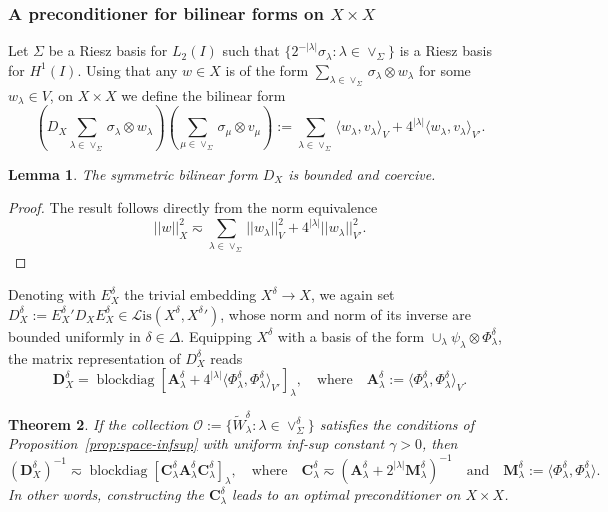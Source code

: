 \documentclass[11pt,a4paper,oneside,english]{amsart}
\numberwithin{equation}{section}
\newtheorem{theorem}{Theorem}
\numberwithin{theorem}{section}
\newtheorem{lemma}[theorem]{Lemma}
\theoremstyle{definition}
\DeclareMathOperator{\blockdiag}{blockdiag}
\newcommand{\la}{\langle}
\newcommand{\ra}{\rangle}
\newcommand{\cL}{\mathcal L}
\newcommand{\Lis}{\cL\mathrm{is}}
\newcommand{\jw}[1]{{\color{red}{JW: #1}}}
\begin{document}
\subsubsection{A preconditioner for bilinear forms on $X \times X$}
Let $\Sigma$ be a Riesz basis for $L_2(I)$ such that
$\{2^{-|\lambda|}\sigma_\lambda : \lambda \in \vee_\Sigma\}$ is a Riesz basis for $H^1(I)$.
Using that any $w \in X$ is of the form $\sum_{\lambda \in \vee_\Sigma} \sigma_\lambda \otimes w_\lambda$ for some $w_\lambda \in V$,
on $X \times X$ we define the bilinear form
\[
  (D_X \sum_{\lambda \in \vee_{\Sigma}} \sigma_\lambda \otimes w_\lambda)(\sum_{\mu \in \vee_{\Sigma}} \sigma_\mu \otimes v_\mu) := \sum_{\lambda \in \vee_\Sigma} \la w_\lambda, v_\lambda \ra_V + 4^{|\lambda|} \la w_\lambda, v_\lambda \ra_{V'}.
\]
\begin{lemma}
  The symmetric bilinear form $D_X$ is bounded and coercive.
\end{lemma}
\begin{proof}
  The result follows directly from the norm equivalence
  \[
    ||w||_X^2 \eqsim \sum_{\lambda \in \vee_\Sigma} ||w_\lambda||_V^2 + 4^{|\lambda|} ||w_\lambda||_{V'}^2.
  \]
  \jw{TODO prove; hier kwamen we vorige keer niet netjes uit.}
\end{proof}
Denoting with $E_X^\delta$ the trivial embedding $X^\delta \to X$, we again set
$D_X^\delta := {E_X^\delta}' D_X E_X^\delta \in \Lis(X^\delta, {X^\delta}')$, whose
norm and norm of its inverse are bounded uniformly in $\delta \in \Delta$. Equipping
$X^\delta$ with a basis of the form $\cup_\lambda \psi_\lambda \otimes \Phi_\lambda^\delta$,
the matrix representation of $D_X^\delta$ reads
\[
  \mathbf D_X^\delta = \blockdiag[\mathbf A_\lambda^\delta + 4^{|\lambda|} \la \Phi_\lambda^\delta, \Phi_\lambda^\delta \ra_{V'}]_\lambda, \quad \text{where} \quad \mathbf A_\lambda^\delta := \la \Phi_\lambda^\delta, \Phi_\lambda^\delta \ra_V.
\]
\begin{theorem}
If the collection $\mathcal O := \{ \tilde W_\lambda^\delta : \lambda \in \vee_\Sigma^\delta\}$
satisfies the conditions of Proposition~\ref{prop:space-infsup} with uniform inf-sup constant $\gamma>0$,
then
  \[
    (\mathbf D_X^\delta)^{-1} \eqsim \blockdiag[\mathbf C_\lambda^\delta \mathbf A_\lambda^\delta \mathbf C_\lambda^\delta]_\lambda, \quad \text{where} \quad \mathbf C_\lambda^\delta \eqsim (\mathbf A_\lambda^\delta + 2^{|\lambda|} \mathbf M_\lambda^\delta)^{-1} \quad \text{and} \quad \mathbf M_\lambda^\delta := \la \Phi_\lambda^\delta, \Phi_\lambda^\delta \ra.
  \]
  In other words, constructing the $\mathbf C_\lambda^\delta$ leads to an optimal preconditioner on $X \times X$.
\end{theorem}
\end{document}

